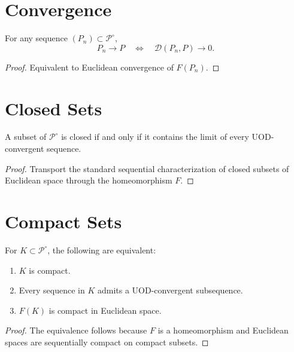 \section{Convergence}
\begin{theorem}
\label{ch:thm:24-4}
For any sequence \((P_n)\subset\mathcal P^\circ\),
\[ P_n\to P
\quad\Longleftrightarrow\quad
\mathcal D(P_n,P)\to0. \]
\end{theorem}
\begin{proof}
Equivalent to Euclidean convergence of \(F(P_n)\). 
\end{proof}
\section{Closed Sets}
\begin{corollary}
\label{ch:cor:24-5}
A subset of \(\mathcal P^\circ\) is closed if and only if
it contains the limit of every UOD-convergent sequence.
\end{corollary}
\begin{proof}
Transport the standard sequential characterization of closed subsets of
Euclidean space through the homeomorphism \(F\). 
\end{proof}
\section{Compact Sets}
\begin{theorem}[Compactness]
\label{ch:thm:24-6}
For \(K\subset\mathcal P^\circ\), the following
are equivalent:
\begin{enumerate}
\item \(K\) is compact.
\item Every sequence in \(K\) admits a UOD-convergent subsequence.
\item \(F(K)\) is compact in Euclidean space.
\end{enumerate}
\end{theorem}
\begin{proof}
The equivalence follows because \(F\) is a homeomorphism and Euclidean
spaces are sequentially compact on compact subsets. 
\end{proof}
